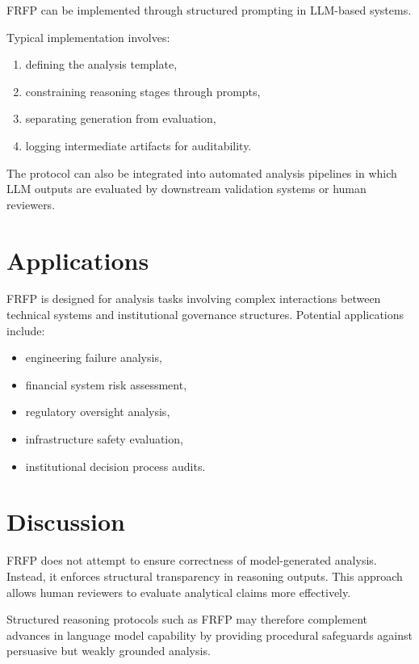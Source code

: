 FRFP can be implemented through structured prompting in LLM-based systems.

Typical implementation involves:

\begin{enumerate}
\item defining the analysis template,
\item constraining reasoning stages through prompts,
\item separating generation from evaluation,
\item logging intermediate artifacts for auditability.
\end{enumerate}

The protocol can also be integrated into automated analysis pipelines in which LLM outputs are evaluated by downstream validation systems or human reviewers.

\section{Applications}

FRFP is designed for analysis tasks involving complex interactions between technical systems and institutional governance structures. Potential applications include:

\begin{itemize}
\item engineering failure analysis,
\item financial system risk assessment,
\item regulatory oversight analysis,
\item infrastructure safety evaluation,
\item institutional decision process audits.
\end{itemize}

\section{Discussion}

FRFP does not attempt to ensure correctness of model-generated analysis. Instead, it enforces structural transparency in reasoning outputs. This approach allows human reviewers to evaluate analytical claims more effectively.

Structured reasoning protocols such as FRFP may therefore complement advances in language model capability by providing procedural safeguards against persuasive but weakly grounded analysis.

